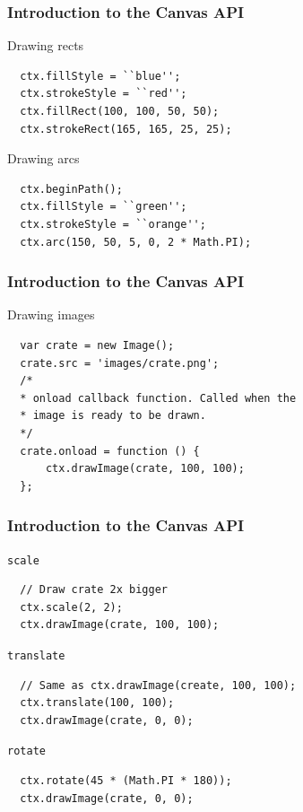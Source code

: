 \begin{frame}[fragile]
  \frametitle{Introduction to the Canvas API}

  \begin{block}{Drawing rects}
  {\scriptsize
  \begin{verbatim}
  ctx.fillStyle = ``blue'';
  ctx.strokeStyle = ``red'';
  ctx.fillRect(100, 100, 50, 50);
  ctx.strokeRect(165, 165, 25, 25);
  \end{verbatim}
  }
  \end{block}

  \pause

  \begin{block}{Drawing arcs}
  {\scriptsize
  \begin{verbatim}
  ctx.beginPath();
  ctx.fillStyle = ``green'';
  ctx.strokeStyle = ``orange'';
  ctx.arc(150, 50, 5, 0, 2 * Math.PI);
  \end{verbatim}
  }
  \end{block}
\end{frame}

\begin{frame}[fragile]
  \frametitle{Introduction to the Canvas API}

  \begin{block}{Drawing images}
  {\scriptsize
  \begin{verbatim}
  var crate = new Image();
  crate.src = 'images/crate.png';
  /*
  * onload callback function. Called when the
  * image is ready to be drawn.
  */
  crate.onload = function () {
      ctx.drawImage(crate, 100, 100);
  };
  \end{verbatim}
  }
  \end{block}
\end{frame}

\begin{frame}[fragile]
  \frametitle{Introduction to the Canvas API}

  \begin{block}{\texttt{scale}}
  {\tiny
  \begin{verbatim}
  // Draw crate 2x bigger
  ctx.scale(2, 2);
  ctx.drawImage(crate, 100, 100);
  \end{verbatim}
  }
  \end{block}

  \pause

  \begin{block}{\texttt{translate}}
  {\tiny
  \begin{verbatim}
  // Same as ctx.drawImage(create, 100, 100);
  ctx.translate(100, 100);
  ctx.drawImage(crate, 0, 0);
  \end{verbatim}
  }
  \end{block}

  \pause

  \begin{block}{\texttt{rotate}}
  {\tiny
  \begin{verbatim}
  ctx.rotate(45 * (Math.PI * 180));
  ctx.drawImage(crate, 0, 0);
  \end{verbatim}
  }
  \end{block}
\end{frame}

